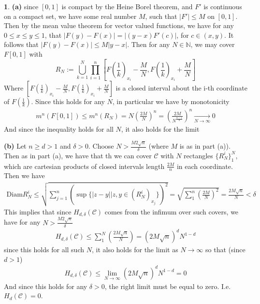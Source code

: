 \documentclass[10.5pt]{article}
\theoremstyle{definition}
\newtheorem{pb}{}
\newcommand{\set}[1]{\{#1\}}
\newcommand{\abs}[1]{\left\vert#1\right\vert}
\begin{document}
    \begin{pb}
        \textbf{(a)}
        since \([0,1]\) is compact by the Heine Borel theorem, and \(F'\) is continuous on a compact set, we have some real number \(M\), such that
        \(\abs{F'} \leq M\) on  \([0,1]\). Then by the mean value theorem for vector valued functions, we have for any \(0 \leq x \leq y \leq 1\), that
        \(\abs{F(y) - F(x)} = \abs{(y-x)F'(c)}\), for \(c \in (x,y)\). It follows that \(\abs{F(y) - F(x)} \leq M\abs{y-x}\). Then for any \(N \in \mathbb{N}\),
        we may cover \(F[0,1]\) with
        \[R_N := \bigcup_{k=1}^N \prod_{i=1}^n [F(\frac{1}{k})_{x_i} - \frac{M}{N}, F(\frac{1}{k})_{x_i} + \frac{M}{N}]\]
        Where \([F(\frac{1}{k})_{x_i} - \frac{M}{N}, F(\frac{1}{k})_{x_i} + \frac{M}{N}]\) is a closed interval about the i-th coordinate of \(F(\frac{1}{k})\).
        Since this holds for any \(N\), in particular we have by monotonicity
        \begin{align*}
            m^n(F[0,1]) \leq m^n(R_N) = N \left(\frac{2M}{N}\right)^n = \left(\frac{2M}{N^{\frac{n-1}{n}}}\right)^n \underset{N \to \infty}{\longrightarrow} 0
        \end{align*}
        And since the inequality holds for all \(N\), it also holds for the limit

        \textbf{(b)}
        Let \(n \geq d > 1\) and \(\delta > 0\). Choose \(N > \frac{M2\sqrt{n}}{\delta}\) (where \(M\) is as in part (a)). Then as in part (a), we have that th we can cover \(\mathcal{C}\) with
        \(N\) rectangles \(\set{R_N^i}_1^N\), which are cartesian products of closed intervals length \(\frac{2M}{n}\) in each coordinate. Then we have
        \begin{align*}
            \text{Diam}R_N^i \leq \sqrt{\sum_{j=1}^n (\sup\set{\abs{z - y} \vert z,y \in (R_N^i)_{x_j}})^2} = \sqrt{\sum_1^n \left(\frac{2M}{N}\right)^2} = \frac{2M\sqrt{n}}{N} < \delta
        \end{align*}
        This implies that since \(H_{d,\delta}(\mathcal{C})\) comes from the infimum over such covers, we have for any \(N > \frac{M2\sqrt{n}}{\delta}\)
        \begin{align*}
            H_{d,\delta}(\mathcal{C}) \leq \sum_1^N \left(\frac{2M\sqrt{n}}{N}\right) = (2M\sqrt{n})^d N^{1-d}
        \end{align*}
        since this holds for all such \(N\), it also holds for the limit as \(N \to \infty\) so that (since \(d > 1\))
        \begin{align*}
            H_{d,\delta}(\mathcal{C}) \leq \lim_{N\to\infty} (2M\sqrt{n})^d N^{1-d} = 0
        \end{align*}
        And since this holds for any \(\delta > 0\), the right limit must be equal to zero. I.e. \(H_d(\mathcal{C}) = 0\).


\end{pb}
\end{document}

